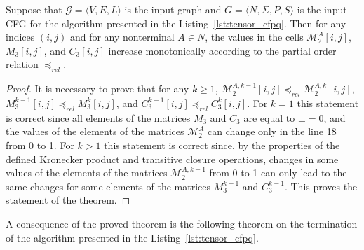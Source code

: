 \begin{theorem}\label{thm:monotone_tensor}
	Suppose that $\mathcal{G} = \langle V, E, L \rangle$ is the input graph and $G = \langle N, \Sigma, P, S \rangle$ is the input CFG for the algorithm presented in the Listing~\ref{lst:tensor_cfpq}. Then for any indices $(i, j)$ and for any nonterminal $A \in N$, the values in the cells $\mathcal{M}_2^{A}[i, j]$, $M_3[i, j]$, and $C_3[i, j]$ increase monotonically according to the partial order relation $\preceq_{\textit{rel}}$.
\end{theorem}
\begin{proof}
It is necessary to prove that for any $k \geq 1$, $\mathcal{M}_2^{A, k - 1}[i, j] \preceq_{\textit{rel}} \mathcal{M}_2^{A, k}[i, j]$,  $M_3^{k - 1}[i, j] \preceq_{\textit{rel}} M_3^{k}[i, j]$, and $C_3^{k - 1}[i, j] \preceq_{\textit{rel}} C_3^{k}[i, j]$. For $k = 1$ this statement is correct since all elements of the matrices $M_3$ and $C_3$ are equal to $\bot = 0$, and the values of the elements of the matrices $\mathcal{M}_2^{A}$ can change only in the line 18 from 0 to 1. For $k > 1$ this statement is correct since, by the properties of the defined Kronecker product and transitive closure operations, changes in some values of the elements of the matrices $\mathcal{M}_2^{A, k - 1}$ from 0 to 1 can only lead to the same changes for some elements of the matrices $M_3^{k - 1}$ and $C_3^{k - 1}$. This proves the statement of the theorem.
\end{proof}

A consequence of the proved theorem is the following theorem on the termination of the algorithm presented in the Listing~\ref{lst:tensor_cfpq}.


